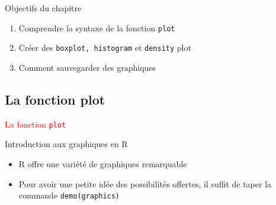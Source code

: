 \documentclass[11pt]{beamer}\usepackage[]{graphicx}\usepackage[]{color}
\newcommand{\code}[1]{\texttt{#1}}
\begin{document}
\begin{frame}[plain]
\hspace*{-1.0cm}\parbox[t]{\textwidth}{
\begin{block}{Objectifs du chapitre}
\begin{enumerate}
\item Comprendre la syntaxe de la fonction \code{plot}
\item Créer des \code{boxplot, histogram} et \code{density} plot
\item Comment sauvegarder des graphiques
\end{enumerate}
\end{block}
}
\end{frame}



\subsection{La fonction plot}

\begin{frame}
 \begin{center}
  \Huge{\textcolor{red}{La fonction \code{plot}}}
 \end{center}
\end{frame}



\begin{frame}[fragile]{Introduction aux graphiques en R}
\begin{itemize}
  \setlength\itemsep{2em}
  \item R offre une variété de graphiques remarquable 
  \item Pour avoir une petite idée des possibilités offertes, il suffit de taper la commande \code{demo(graphics)} 
\end{itemize}
\end{frame}
\end{document}
